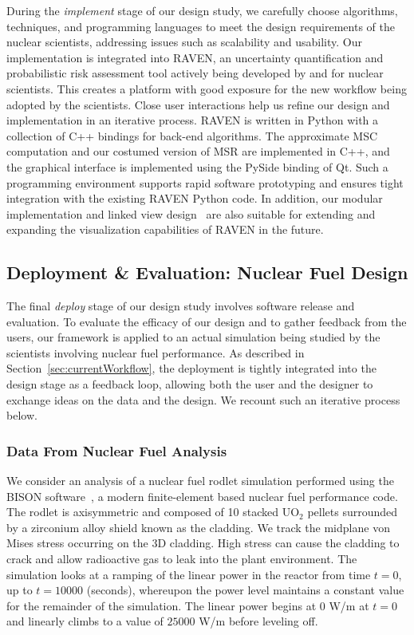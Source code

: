 During the \emph{implement} stage of our design study, we carefully choose algorithms, techniques, and programming languages to meet the design requirements of the nuclear scientists, addressing issues such as scalability and usability.
%
Our implementation is integrated into RAVEN, an uncertainty quantification and probabilistic risk assessment tool actively being developed by and for nuclear scientists.
%
This creates a platform with good exposure for the new workflow being adopted by the scientists.
%
Close user interactions help us refine our design and implementation in an iterative process.
%
RAVEN is written in Python with a collection of C++ bindings for back-end algorithms.
%
The approximate MSC computation and our costumed version of MSR are implemented in C++, and the graphical interface is implemented using the PySide binding of Qt.
%
Such a programming environment supports rapid software prototyping and ensures tight integration with the existing RAVEN Python code.
%
In addition, our modular implementation and linked view design~\cite{Roberts2007}  are also suitable for extending and expanding the visualization capabilities of RAVEN in the future.

\subsection{Deployment \& Evaluation: Nuclear Fuel Design}
\label{sec:saApplication}
The final \emph{deploy} stage of our design study involves software release and evaluation.
%
To evaluate the efficacy of our design and to gather feedback from the users, our framework is applied to an actual simulation being studied by the scientists involving nuclear fuel performance.
%
As described in Section~\ref{sec:currentWorkflow}, the deployment is tightly integrated into the design stage as a feedback loop, allowing both the user and the designer to exchange ideas on the data and the design.
%
We recount such an iterative process below.

\subsubsection{Data From Nuclear Fuel Analysis}
\label{sec:applicationBackground}
We consider an analysis of a nuclear fuel rodlet simulation performed using the BISON software~\cite{HalesNovasconePastore2013}, a modern finite-element based nuclear fuel performance code.
%
The rodlet is axisymmetric and composed of 10 stacked UO$_2$ pellets surrounded by a zirconium alloy shield known as the cladding.
%
We track the midplane von Mises stress occurring on the 3D
cladding.
%
High stress can cause the cladding to crack and allow radioactive gas to leak into the plant environment.
%
The simulation looks at a ramping of the linear power in the reactor from time $t=0$, up to $t=10000$ (seconds), whereupon the power level maintains a constant value for the remainder of the simulation.
%
The linear power begins at $0$ W/m at $t=0$ and linearly climbs to a value of $25000$ W/m before leveling off.

